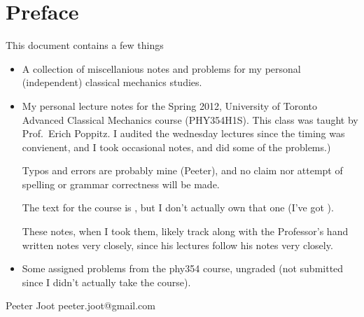\chapter*{Preface}\normalsize

This document contains a few things

\begin{itemize}
\item A collection of miscellanious notes and problems for my personal (independent) classical mechanics studies.

\item My personal lecture notes for the Spring 2012, University of Toronto Advanced Classical Mechanics course (PHY354H1S).  This class was taught by Prof.\ Erich Poppitz.  I audited the wednesday lectures since the timing was convienent, and I took occasional notes, and did some of the problems.)

Typos and errors are probably mine (Peeter), and no claim nor attempt of spelling or grammar correctness will be made.  

The text for the course is \citep{landau1960classical}, but I don't actually own that one (I've got \cite{goldstein1951cm}).

These notes, when I took them, likely track along with the Professor's hand written notes very closely, since his lectures follow his notes very closely.

\item Some assigned problems from the phy354 course, ungraded (not submitted since I didn't actually take the course).

%
\end{itemize}

Peeter Joot  \quad peeter.joot@gmail.com 
